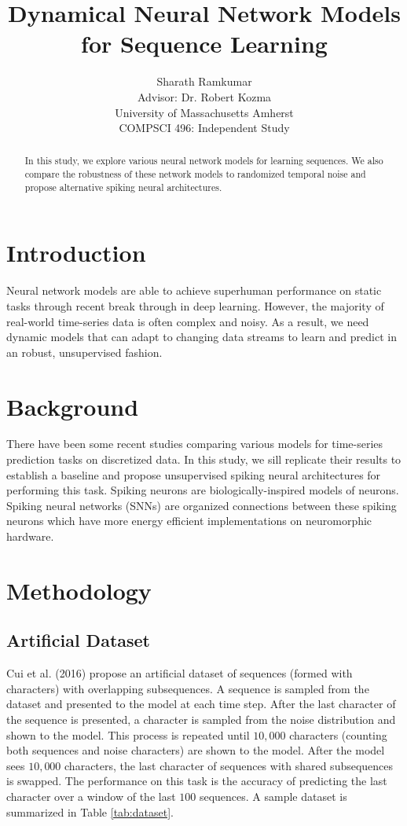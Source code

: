 \documentclass{article}
\title{Dynamical Neural Network Models\\for Sequence Learning}
\author{Sharath Ramkumar\\
Advisor: Dr. Robert Kozma\\University of Massachusetts Amherst\\COMPSCI 496: Independent Study}
\date{}
\begin{document}
\maketitle

\begin{abstract}
In this study, we explore various neural network models for learning sequences. We also compare the robustness of these network models to randomized temporal noise and propose alternative spiking neural architectures.
\end{abstract}


\section*{Introduction}

Neural network models are able to achieve superhuman performance on static tasks through recent break through in deep learning. However, the majority of real-world time-series data is often complex and noisy. As a result, we need dynamic models that can adapt to changing data streams to learn and predict in an robust, unsupervised fashion. 

\section*{Background}
There have been some recent studies comparing various models for time-series prediction tasks \cite{cui2016continuous} on discretized data. In this study, we sill replicate their results to establish a baseline and propose unsupervised spiking neural architectures for performing this task. Spiking neurons \cite{gerstner2002spiking} are biologically-inspired models of neurons. Spiking neural networks (SNNs) \cite{maass1997networks} are organized connections between these spiking neurons which have more energy efficient \cite{cruz2012energy} implementations on neuromorphic hardware. 

\section*{Methodology}

\subsection*{Artificial Dataset}

Cui et al. (2016) propose an artificial dataset of sequences (formed with characters) with overlapping subsequences. A sequence is sampled from the dataset and presented to the model at each time step. After the last character of the sequence is presented, a character is sampled from the noise distribution and shown to the model. This process is repeated until $10,000$ characters (counting both sequences and noise characters) are shown to the model. After the model sees $10,000$ characters, the last character of sequences with shared subsequences is swapped. The performance on this task is the accuracy of predicting the last character over a window of the last $100$ sequences. A sample dataset is summarized in Table \ref{tab:dataset}.
\end{document}
